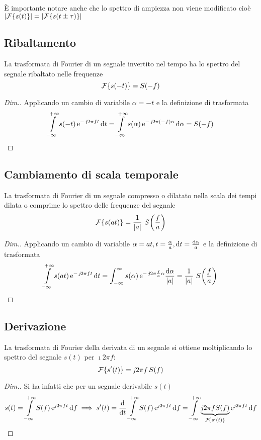 È importante notare anche che lo spettro di ampiezza non viene modificato cioè \\ $\left|{\operatorname{\mathcal{F}}\!\left\lbrace{s(t)}\right\rbrace}\right|=\left|{\operatorname{\mathcal{F}}\!\left\lbrace{s(t\pm\tau)}\right\rbrace}\right|$

\subsection{Ribaltamento}
La trasformata di Fourier di un segnale invertito nel tempo ha lo spettro del segnale ribaltato nelle frequenze
\begin{equation}
	\operatorname{\mathcal{F}}\!\left\lbrace{s(-t)}\right\rbrace=S(-f)
\end{equation}
\begin{proof}[Dim.]
Applicando un cambio di variabile $\alpha=-t$ e la definizione di trasformata
\[
	\int\limits_{-\infty}^{+\infty}{s(-t)\operatorname{e}^{-\operatorname{\mathit{j}\!} 2\pi f t}}{\,\mathop{}\!\mathrm{d}{t}}=
	\int\limits_{-\infty}^{+\infty}{s(\alpha)\operatorname{e}^{-\operatorname{\mathit{j}\!} 2\pi (-f)\alpha}}{\,\mathop{}\!\mathrm{d}{\alpha}}=S(-f)
\qedhere
\]
\end{proof}

\subsection{Cambiamento di scala temporale}
La trasformata di Fourier di un segnale compresso o dilatato nella scala dei tempi dilata o comprime lo spettro delle frequenze del segnale
\begin{equation}
\label{eq:trasf_Fourier_scala}
	\operatorname{\mathcal{F}}\!\left\lbrace{s(a t)}\right\rbrace=\frac{1}{\left|{a}\right|}\,\,{S}^{}\!\left({\frac{f}{a}}\right)
\end{equation}
\begin{proof}[Dim.]
Applicando un cambio di variabile $\alpha=a t, t=\frac{\alpha}{a}, \mathop{}\!\mathrm{d} t=\frac{\mathop{}\!\mathrm{d}\alpha}{a}$ e la definizione di trasformata
\[
	\int\limits_{-\infty}^{+\infty}{s(a t)\operatorname{e}^{-\operatorname{\mathit{j}\!} 2\pi f t}}{\,\mathop{}\!\mathrm{d}{t}}=
	\int_{-\infty}^{\infty}{s(\alpha)\operatorname{e}^{-\operatorname{\mathit{j}\!} 2\pi\frac{f}{a}\alpha}}{\frac{\mathop{}\!\mathrm{d}\alpha}{\left|{a}\right|}}=\frac{1}{\left|{a}\right|}\,\,{S}^{}\!\left({\frac{f}{a}}\right)
\qedhere
\]
\end{proof}

\subsection{Derivazione}
La trasformata di Fourier della derivata di un segnale si ottiene moltiplicando lo spettro del segnale $s(t)$ per $\imath 2\pi f$:
\begin{equation}
	\operatorname{\mathcal{F}}\!\left\lbrace{s'(t)}\right\rbrace=\operatorname{\mathit{j}\!} 2\pi f\,S(f)
\end{equation}
\begin{proof}[Dim.]
Si ha infatti che per un segnale derivabile $s(t)$
\[
	s(t)=\intinf{S(f)\e{\imath 2\pi f t}}{f}\implies s'(t)=\deriv{}{t}\intinf{S(f)\e{\imath 2\pi f t}}{f}=
\intinf{ \underbrace{\imath 2\pi f S(f)}_{\fourier{s'(t)}}\e{\imath 2\pi f t}}{f}
\qedhere
\]
\end{proof}

